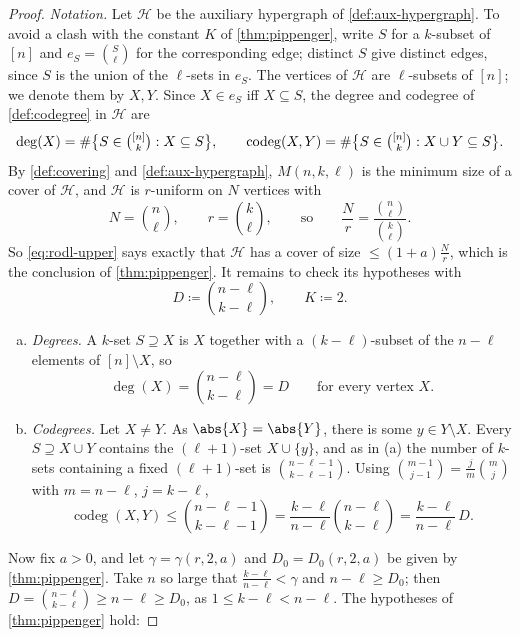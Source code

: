 \begin{proof}
    \emph{Notation.} Let \(\mathcal{H}\) be the auxiliary hypergraph of \autoref{def:aux-hypergraph}. To avoid a clash with the constant \(K\) of \autoref{thm:pippenger}, write \(S\) for a \(k\)-subset of \([n]\) and \(e_S = \binom{S}{\ell}\) for the corresponding edge; distinct \(S\) give distinct edges, since \(S\) is the union of the \(\ell\)-sets in \(e_S\). The vertices of \(\mathcal{H}\) are \(\ell\)-subsets of \([n]\); we denote them by \(X, Y\). Since \(X \in e_S\) iff \(X \subseteq S\), the degree and codegree of \autoref{def:codegree} in \(\mathcal{H}\) are
    \[
        \deg(X) = \#\bigl\{ S \in \tbinom{[n]}{k} : X \subseteq S \bigr\},
        \qquad
        \operatorname{codeg}(X,Y) = \#\bigl\{ S \in \tbinom{[n]}{k} : X \cup Y \subseteq S \bigr\}.
    \]
    By \autoref{def:covering} and \autoref{def:aux-hypergraph}, \(M(n,k,\ell)\) is the minimum size of a cover of \(\mathcal{H}\), and \(\mathcal{H}\) is \(r\)-uniform on \(N\) vertices with
    \[
        N = \binom{n}{\ell},
        \qquad
        r = \binom{k}{\ell},
        \qquad\text{so}\qquad
        \frac{N}{r} = \frac{\binom{n}{\ell}}{\binom{k}{\ell}} .
    \]
    So \eqref{eq:rodl-upper} says exactly that \(\mathcal{H}\) has a cover of size \(\le (1+a)\frac{N}{r}\), which is the conclusion of \autoref{thm:pippenger}. It remains to check its hypotheses with
    \[
        D \coloneqq \binom{n-\ell}{k-\ell},
        \qquad
        K \coloneqq 2 .
    \]
    \begin{enumerate}[(a)]
        \item \emph{Degrees.} A \(k\)-set \(S \supseteq X\) is \(X\) together with a \((k-\ell)\)-subset of the \(n - \ell\) elements of \([n] \setminus X\), so
        \[
            \deg(X) = \binom{n-\ell}{k-\ell} = D \qquad\text{for every vertex } X.
        \]
        \item \emph{Codegrees.} Let \(X \ne Y\). As \(\abs{X} = \abs{Y}\), there is some \(y \in Y \setminus X\). Every \(S \supseteq X \cup Y\) contains the \((\ell+1)\)-set \(X \cup \{y\}\), and as in (a) the number of \(k\)-sets containing a fixed \((\ell+1)\)-set is \(\binom{n-\ell-1}{k-\ell-1}\). Using \(\binom{m-1}{j-1} = \frac{j}{m}\binom{m}{j}\) with \(m = n - \ell\), \(j = k - \ell\),
        \[
            \operatorname{codeg}(X,Y) \le \binom{n-\ell-1}{k-\ell-1} = \frac{k-\ell}{n-\ell} \binom{n-\ell}{k-\ell} = \frac{k-\ell}{n-\ell}\, D .
        \]
    \end{enumerate}
    Now fix \(a > 0\), and let \(\gamma = \gamma(r, 2, a)\) and \(D_0 = D_0(r, 2, a)\) be given by \autoref{thm:pippenger}. Take \(n\) so large that \(\frac{k-\ell}{n-\ell} < \gamma\) and \(n - \ell \ge D_0\); then \(D = \binom{n-\ell}{k-\ell} \ge n - \ell \ge D_0\), as \(1 \le k - \ell < n - \ell\). The hypotheses of \autoref{thm:pippenger} hold:

\end{proof}
